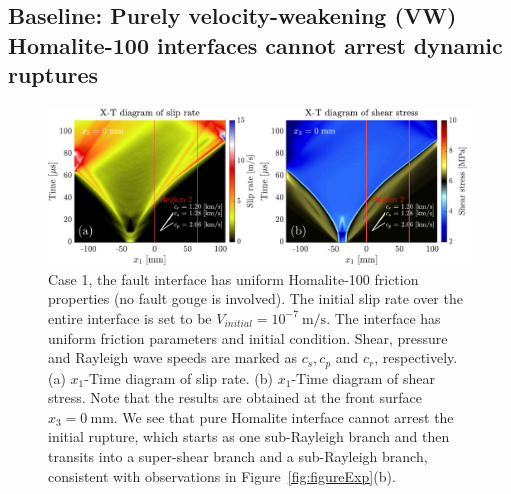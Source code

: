 \documentclass[final,a4paper]{elsarticle}
\begin{document}
\subsection{Baseline: Purely velocity-weakening (VW) Homalite-100 interfaces cannot arrest dynamic ruptures} \label{subsec:baseline}
\begin{figure}[htbp]
    \centering
    \includegraphics[width=1.\textwidth]{case1_wholefield_x3_0.pdf}
    \caption{Case 1, the fault interface has uniform Homalite-100 friction properties (no fault gouge is involved). 
    The initial slip rate over the entire interface is set to be $V_{initial}=10^{-7}\ \mathrm{m/s}.$
    The interface has uniform friction parameters and initial condition. 
    Shear, 
    pressure and Rayleigh wave speeds are marked as $c_s, c_p$ and $c_r$, 
    respectively.
    (a) $x_1$-Time diagram of slip rate. 
    (b) $x_1$-Time diagram of shear stress. 
    Note that the results are obtained at the front surface $x_3 = 0\ \mathrm{mm}$.
    We see that pure Homalite interface cannot arrest the initial rupture, 
    which starts as one sub-Rayleigh branch and then transits into a super-shear branch and a sub-Rayleigh branch, 
    consistent with observations in Figure~\ref{fig:figureExp}(b).}
    \label{fig:case1WholeFieldX3_0}
\end{figure}
\end{document}
